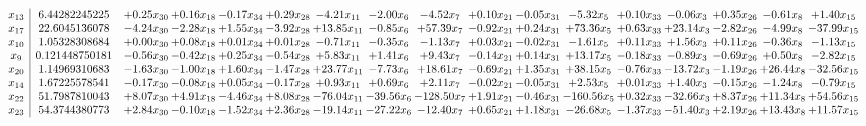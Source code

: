 \documentclass[9pt]{article}
\begin{document}
 \[\begin{array}{c| c c@{\hskip 2pt} c@{\hskip 2pt} c@{\hskip 2pt} c@{\hskip 2pt} c@{\hskip 2pt} c@{\hskip 2pt} c@{\hskip 2pt} c@{\hskip 2pt} c@{\hskip 2pt} c@{\hskip 2pt} c@{\hskip 2pt} c@{\hskip 2pt} c@{\hskip 2pt} c@{\hskip 2pt} c@{\hskip 2pt} }
 x_{13}   &  6.44282245225 & +  0.25 x_{30} & +  0.16 x_{18} & -0.17 x_{34} & +  0.29 x_{28} & -4.21 x_{11} & -2.00 x_{6} & -4.52 x_{7} & +  0.10 x_{21} & -0.05 x_{31} & -5.32 x_{5} & +  0.10 x_{33} & -0.06 x_{3} & +  0.35 x_{26} & -0.61 x_{8} & +  1.40 x_{15}\\
 x_{17}   &  22.6045136078 & -4.24 x_{30} & -2.28 x_{18} & +  1.55 x_{34} & -3.92 x_{28} & + 13.85 x_{11} & -0.85 x_{6} & + 57.39 x_{7} & -0.92 x_{21} & +  0.24 x_{31} & + 73.36 x_{5} & +  0.63 x_{33} & + 23.14 x_{3} & -2.82 x_{26} & -4.99 x_{8} & -37.99 x_{15}\\
 x_{10}   &  1.05328308684 & +  0.00 x_{30} & +  0.08 x_{18} & +  0.01 x_{34} & +  0.01 x_{28} & -0.71 x_{11} & -0.35 x_{6} & -1.13 x_{7} & +  0.03 x_{21} & -0.02 x_{31} & -1.61 x_{5} & +  0.11 x_{33} & +  1.56 x_{3} & +  0.11 x_{26} & -0.36 x_{8} & -1.13 x_{15}\\
 x_{9}   &  0.121448750181 & -0.56 x_{30} & -0.42 x_{18} & +  0.25 x_{34} & -0.54 x_{28} & +  5.83 x_{11} & +  1.41 x_{6} & +  9.43 x_{7} & -0.14 x_{21} & +  0.14 x_{31} & + 13.17 x_{5} & -0.18 x_{33} & -0.89 x_{3} & -0.69 x_{26} & +  0.50 x_{8} & -2.82 x_{15}\\
 x_{20}   &  1.14969310683 & -1.63 x_{30} & -1.00 x_{18} & +  1.60 x_{34} & -1.47 x_{28} & + 23.77 x_{11} & -7.73 x_{6} & + 18.61 x_{7} & -0.69 x_{21} & +  1.35 x_{31} & + 38.15 x_{5} & -0.76 x_{33} & -13.72 x_{3} & -1.19 x_{26} & + 26.44 x_{8} & -32.56 x_{15}\\
 x_{14}   &  1.67225578541 & -0.17 x_{30} & -0.08 x_{18} & +  0.05 x_{34} & -0.17 x_{28} & +  0.93 x_{11} & +  0.69 x_{6} & +  2.11 x_{7} & -0.02 x_{21} & -0.05 x_{31} & +  2.53 x_{5} & +  0.01 x_{33} & +  1.40 x_{3} & -0.15 x_{26} & -1.24 x_{8} & -0.79 x_{15}\\
 x_{22}   &  51.7987810043 & +  8.07 x_{30} & +  4.91 x_{18} & -4.46 x_{34} & +  8.08 x_{28} & -76.04 x_{11} & -39.56 x_{6} & -128.50 x_{7} & +  1.91 x_{21} & -0.46 x_{31} & -160.56 x_{5} & +  0.32 x_{33} & -32.66 x_{3} & +  8.37 x_{26} & + 11.34 x_{8} & + 54.56 x_{15}\\
 x_{23}   &  54.3744380773 & +  2.84 x_{30} & -0.10 x_{18} & -1.52 x_{34} & +  2.36 x_{28} & -19.14 x_{11} & -27.22 x_{6} & -12.40 x_{7} & +  0.65 x_{21} & +  1.18 x_{31} & -26.68 x_{5} & -1.37 x_{33} & -51.40 x_{3} & +  2.19 x_{26} & + 13.43 x_{8} & + 11.57 x_{15}\\

\end{array}\]
\end{document}
